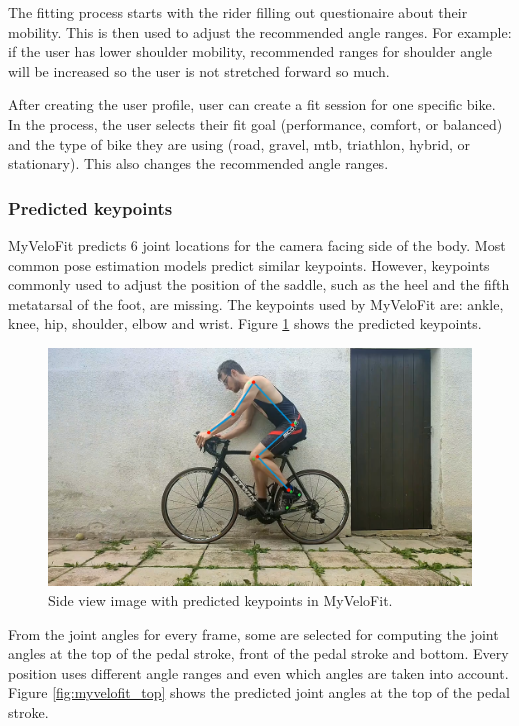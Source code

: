 The fitting process starts with the rider filling out questionaire about their mobility. This is then used to adjust the recommended angle ranges. For example: if the user has lower shoulder mobility, recommended ranges for shoulder angle will be increased so the user is not stretched forward so much.

After creating the user profile, user can create a fit session for one specific bike. In the process, the user selects their fit goal (performance, comfort, or balanced) and the type of bike they are using (road, gravel, mtb, triathlon, hybrid, or stationary). This also changes the recommended angle ranges.

\subsubsection{Predicted keypoints}
MyVeloFit predicts 6 joint locations for the camera facing side of the body. Most common pose estimation models predict similar keypoints. However, keypoints commonly used to adjust the position of the saddle, such as the heel and the fifth metatarsal of the foot, are missing. The keypoints used by MyVeloFit are: ankle, knee, hip, shoulder, elbow and wrist. Figure \ref{fig:myvelofit_keypoints} shows the predicted keypoints.


\begin{figure}[htbp]
    \centering
    \includegraphics[width=\textwidth]{obrazky-figures/myvelofit_keypoints.png}
    \caption{Side view image with predicted keypoints in MyVeloFit.}
    \label{fig:myvelofit_keypoints}
\end{figure}

From the joint angles for every frame, some are selected for computing the joint angles at the top of the pedal stroke, front of the pedal stroke and bottom. Every position uses different angle ranges and even which angles are taken into account. Figure \ref{fig:myvelofit_top} shows the predicted joint angles at the top of the pedal stroke.

